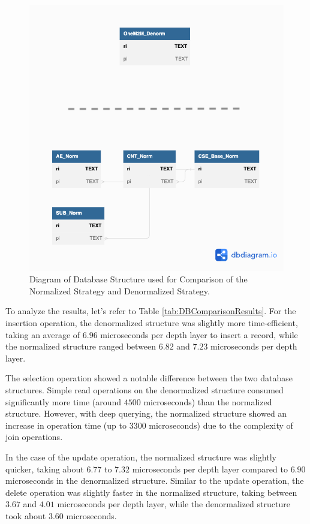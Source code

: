 \documentclass[a4paper,fleqn]{cas-dc}
\begin{document}
\begin{figure}[h]
	\centering
	\includegraphics[width=\linewidth]{TestComparisionDBsStrategies}
	\caption{Diagram of Database Structure used for Comparison of the Normalized Strategy and Denormalized Strategy.}
	\label{fig:TestComparisionDBsStrategies}
\end{figure}

To analyze the results, let's refer to Table \ref{tab:DBComparisonResults}. For the insertion operation, the denormalized structure was slightly more time-efficient, taking an average of $6.96$ microseconds per depth layer to insert a record, while the normalized structure ranged between $6.82$ and $7.23$ microseconds per depth layer.

The selection operation showed a notable difference between the two database structures. Simple read operations on the denormalized structure consumed significantly more time (around $4500$ microseconds) than the normalized structure. However, with deep querying, the normalized structure showed an increase in operation time (up to $3300$ microseconds) due to the complexity of join operations.

In the case of the update operation, the normalized structure was slightly quicker, taking about $6.77$ to $7.32$ microseconds per depth layer compared to $6.90$ microseconds in the denormalized structure. Similar to the update operation, the delete operation was slightly faster in the normalized structure, taking between $3.67$ and $4.01$ microseconds per depth layer, while the denormalized structure took about $3.60$ microseconds.
\end{document}
